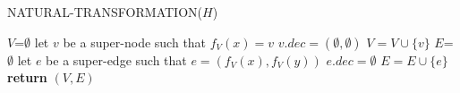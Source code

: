 \begin{algorithm}[H]
    \begin{algorithmic}[1]
        \caption{NATURAL-TRANSFORMATION($H$)}\label{alg:cap1}
        \State $V$=$\emptyset$
            \State let $v$ be a super-node such that $f_V(x)=v$
            \State $v.dec=(\emptyset, \emptyset)$
            \State $V = V \cup \{v\}$
        \EndFor
        \State $E$=$\emptyset$
            \State let $e$ be a super-edge such that $e=(f_V(x), f_V(y))$
            \State $e.dec=\emptyset$
            \State $E=E\cup \{e\}$
        \EndFor
        \State \textbf{return} $(V, E)$
    \end{algorithmic}
\end{algorithm}
